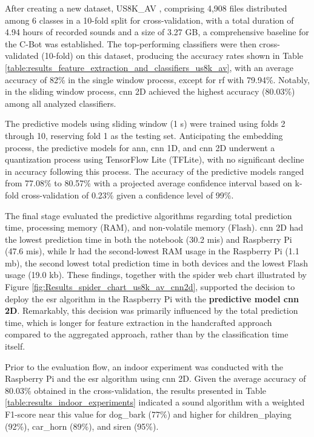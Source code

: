 After creating a new dataset, US8K\_AV \cite{florentino2024}, comprising 4,908 files distributed among 6 classes in a 10-fold split for cross-validation, with a total duration of 4.94 hours of recorded sounds and a size of 3.27 GB, a comprehensive baseline for the C-Bot was established. The top-performing classifiers were then cross-validated (10-fold) on this dataset, producing the accuracy rates shown in Table \ref{table:results_feature_extraction_and_classifiers_us8k_av}, with an average accuracy of 82\% in the single window process, except for \gls{rf} with 79.94\%. Notably, in the sliding window process, \gls{cnn} 2D achieved the highest accuracy (80.03\%) among all analyzed classifiers.

The predictive models using sliding window (1 \gls{s}) were trained using folds 2 through 10, reserving fold 1 as the testing set. Anticipating the embedding process, the predictive models for \gls{ann}, \gls{cnn} 1D, and \gls{cnn} 2D underwent a quantization process using TensorFlow Lite (TFLite), with no significant decline in accuracy following this process. The accuracy of the predictive models ranged from 77.08\% to 80.57\% with a projected average
confidence interval based on k-fold cross-validation of 0.23\% given a confidence level of 99\%.

The final stage evaluated the predictive algorithms regarding total prediction time, processing memory (RAM), and non-volatile memory (Flash). \gls{cnn} 2D had the lowest prediction time in both the notebook (30.2 \gls{mi}\gls{s}) and Raspberry Pi (47.6 \gls{mi}\gls{s}), while \gls{lr} had the second-lowest RAM usage in the Raspberry Pi (1.1 \gls{m}\gls{b}), the second lowest total prediction time in both devices and the lowest Flash usage (19.0 \gls{k}\gls{b}). These findings, together with the spider web chart illustrated by Figure \ref{fig:Results_spider_chart_us8k_av_cnn2d}, supported the decision to deploy the \gls{esr} algorithm in the Raspberry Pi with the \textbf{predictive model \gls{cnn} 2D}. Remarkably, this decision was primarily influenced by the total prediction time, which is longer for feature extraction in the handcrafted approach compared to the aggregated approach, rather than by the classification time itself.

Prior to the evaluation flow, an indoor experiment was conducted with the Raspberry Pi and the \gls{esr} algorithm using \gls{cnn} 2D. Given the average accuracy of 80.03\% obtained in the cross-validation, the results presented in Table \ref{table:results_indoor_experiments} indicated a sound algorithm with a weighted F1-score near this value for dog\_bark (77\%) and higher for children\_playing (92\%), car\_horn (89\%), and siren (95\%).


